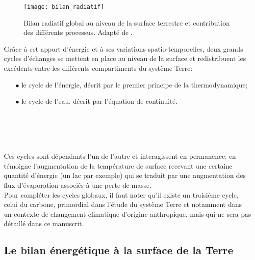 \begin{figure}[h!]
 \centerline{\texttt{[image: bilan\_radiatif]}}
 \caption{Bilan radiatif global au niveau de la surface terrestre et contribution des différents processus. Adapté de \citet{trenberth2009}.}
 \label{radia_budget}
\end{figure}

\noindent Grâce à cet apport d'énergie et à ses variations spatio-temporelles, deux grands cycles d'échanges se mettent en place au niveau de la surface et redistribuent les excédents entre les différents compartiments du système Terre:\\ 

\begin{itemize}
\item[$\bullet$] le cycle de l'énergie, décrit par le premier principe de la thermodynamique;
\item[$\bullet$] le cycle de l'eau, décrit par l'équation de continuité.
\end{itemize}
~\\
~\\
~\\
~\\
Ces cycles sont dépendants l'un de l'autre et interagissent en permanence; en témoigne l'augmentation de la température de surface recevant une certaine quantité d'énergie (un lac par exemple) qui se traduit par une augmentation des flux d'évaporation associés à une perte de masse.\\
Pour compléter les cycles globaux, il faut noter qu'il existe un troisième cycle, celui du carbone, primordial dans l'étude du système Terre et notamment dans un contexte de changement climatique d'origine anthropique, mais qui ne sera pas détaillé dans ce manuscrit.

\subsection{{\selectfont Le bilan énergétique à la surface de la Terre}}
\label{sec:bilan_energie}

